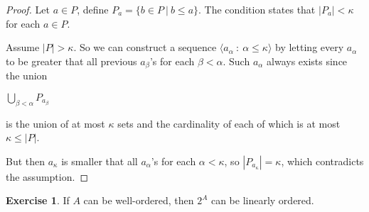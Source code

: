 \documentclass[8pt]{article}
\theoremstyle{definition}
\theoremstyle{definition}
\theoremstyle{definition}
\theoremstyle{definition}
\theoremstyle{definition}
\theoremstyle{definition}
\theoremstyle{definition}
\theoremstyle{definition}
\theoremstyle{definition}
\theoremstyle{definition}
\theoremstyle{definition}
\theoremstyle{definition}
\theoremstyle{definition}
\newtheorem{exercise}{Exercise}[section]
\theoremstyle{definition}
\theoremstyle{question}
\begin{document}
\begin{proof}
  Let $a \in P$, define $P_a = \{ b \in P \: | \: b \leq a \}$. The condition states that
  $|P_a| < \kappa$ for each $a \in P$.

  Assume $|P| > \kappa$. So we can construct a sequence 
  $\langle a_{\alpha} \: : \: \alpha \leq \kappa \rangle$ by letting
  every $a_{\alpha}$ to be greater that all previous $a_{\beta}$'s for each $\beta < \alpha$.
  Such $a_{\alpha}$ always exists since the union
  \begin{center}
    $\bigcup \limits_{\beta < \alpha} P_{a_{\beta}}$
  \end{center}
  is the union of at most $\kappa$ sets and the cardinality of each of which is at most $\kappa 
  \leq |P|$.

  But then $a_{\kappa}$ is smaller that all $a_{\alpha}$'s for each $\alpha < \kappa$, so $|P_{a_{\kappa}}| = \kappa$, which
  contradicts the assumption.
\end{proof}

\begin{exercise}
  If $A$ can be well-ordered, then $2^A$ can be linearly ordered.
\end{exercise}
\end{document}
